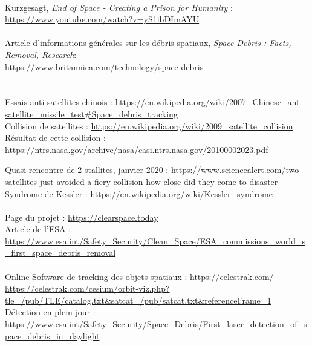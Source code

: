\documentclass[a4paper,1pt]{article}
\begin{document}
\begin{thebibliography}{11}

~\\
	Kurzgesagt, \textit{End of Space - Creating a Prison for Humanity} :\\
	\url{https://www.youtube.com/watch?v=yS1ibDImAYU}\\
	
~\\
	Article d'informations générales sur les débris spatiaux, \textit{Space Debris : Facts, Removal, Research}: \\ \url{https://www.britannica.com/technology/space-debris}\\\\
    
 ~\\

		Essais anti-satellites chinois : \url{https://en.wikipedia.org/wiki/2007_Chinese_anti-satellite_missile_test#Space_debris_tracking}\\
		
		Collision de satellites : \url{https://en.wikipedia.org/wiki/2009_satellite_collision}\\
		
		Résultat de cette collision : \url{https://ntrs.nasa.gov/archive/nasa/casi.ntrs.nasa.gov/20100002023.pdf}
		
		Quasi-rencontre de 2 stallites, janvier 2020 : \url{https://www.sciencealert.com/two-satellites-just-avoided-a-fiery-collision-how-close-did-they-come-to-disaster}\\
		
		Syndrome de Kessler : \url{https://en.wikipedia.org/wiki/Kessler_syndrome}\\


~\\
	Page du projet : \url{https://clearspace.today}\\
	
	Article de l'ESA : \url{https://www.esa.int/Safety_Security/Clean_Space/ESA_commissions_world_s_first_space_debris_removal}\\
	
~\\
		Online Software de tracking des objets spatiaux : \url{https://celestrak.com/}
		\\ \url{https://celestrak.com/cesium/orbit-viz.php?tle=/pub/TLE/catalog.txt&satcat=/pub/satcat.txt&referenceFrame=1}
~\\
		Détection en plein jour : \url{https://www.esa.int/Safety_Security/Space_Debris/First_laser_detection_of_space_debris_in_daylight}
\\


\end{thebibliography}
\end{document}
